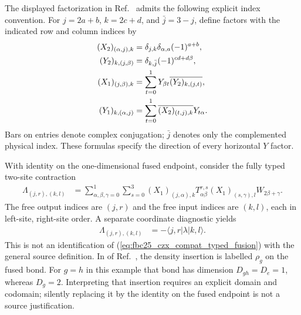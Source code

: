 \documentclass{article}
\begin{document}
The displayed factorization in
Ref.~\cite[lines~4559--4659]{FrancoRubio2025MPUGauging} admits the following explicit index convention. For $j=2a+b$, $k=2c+d$, and $\bar j=3-j$, define factors with the indicated row and column indices by
\begin{align}
    (X_2)_{(\alpha,j),k} & =\delta_{j,k}\delta_{\alpha,a}(-1)^{a+b},
    \label{eq:fbc25_czx_compat_filled_left}                                           \\
    (Y_2)_{k,(j,\beta)}  & =\delta_{k,\bar j}(-1)^{cd+d\beta}, \notag                 \\
    (X_1)_{(j,\beta),k}  & =\sum_{t=0}^1Y_{\beta t}\overline{(Y_2)_{k,(j,t)}}, \notag \\
    (Y_1)_{k,(\alpha,j)} & =\sum_{t=0}^1\overline{(X_2)_{(t,j),k}}Y_{t\alpha}.
    \label{eq:fbc25_czx_compat_empty_right}
\end{align}
Bars on entries denote complex conjugation; $\bar j$ denotes only the complemented physical index. These formulas specify the direction of every horizontal $Y$ factor.

With identity on the one-dimensional fused endpoint, consider the fully typed two-site contraction
\begin{align}
    \Lambda_{(j,r),(k,l)}
     & =\sum_{\alpha,\beta,\gamma=0}^1\sum_{s=0}^3
    (X_1)_{(j,\alpha),k}
    T^{r,s}_{\alpha\beta}
    (X_1)_{(s,\gamma),l}
    W_{2\beta+\gamma}.
    \label{eq:fbc25_czx_compat_typed_fusion}
\end{align}
The free output indices are $(j,r)$ and the free input indices are $(k,l)$, each in left-site, right-site order. A separate coordinate diagnostic yields
\begin{align}
    \Lambda_{(j,r),(k,l)} & =-\langle j,r|\lambda|k,l\rangle.
    \label{eq:fbc25_czx_compat_typed_fusion_sign}
\end{align}
This is not an identification of
(\ref{eq:fbc25_czx_compat_typed_fusion}) with the general source definition. In
 of
Ref.~\cite[lines~2675--2704]{FrancoRubio2025MPUGauging}, the density insertion is labelled $\rho_g$ on the fused bond. For $g=h$ in this example that bond has dimension $D_{gh}=D_e=1$, whereas $D_g=2$. Interpreting that insertion requires an explicit domain and codomain; silently replacing it by the identity on the fused endpoint is not a source justification.
\end{document}
